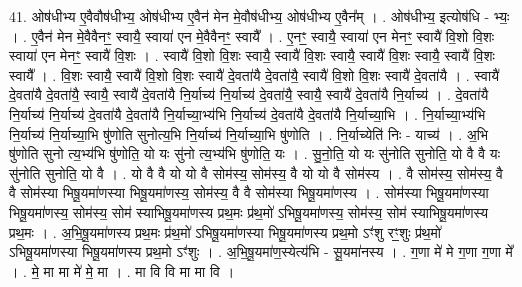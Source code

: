 \documentclass[17pt]{extarticle}
\begin{document}
41. ओष॑धीभ्य ए॒वैवौष॑धीभ्य॒ ओष॑धीभ्य ए॒वैन॑ मेन मे॒वौष॑धीभ्य॒ ओष॑धीभ्य ए॒वैन᳚म् । . ओष॑धीभ्य॒ इत्योष॑धि - भ्यः॒ । . ए॒वैन॑ मेन मे॒वैवैनꣳ॒॒ स्वायै॒ स्वाया॑ एन मे॒वैवैनꣳ॒॒ स्वायै᳚ । . ए॒नꣳ॒॒ स्वायै॒ स्वाया॑ एन मेनꣳ॒॒ स्वायै॑ वि॒शो वि॒शः स्वाया॑ एन मेनꣳ॒॒ स्वायै॑ वि॒शः । . स्वायै॑ वि॒शो वि॒शः स्वायै॒ स्वायै॑ वि॒शः स्वायै॒ स्वायै॑ वि॒शः स्वायै॒ स्वायै॑ वि॒शः स्वायै᳚ । . वि॒शः स्वायै॒ स्वायै॑ वि॒शो वि॒शः स्वायै॑ दे॒वता॑यै दे॒वता॑यै॒ स्वायै॑ वि॒शो वि॒शः स्वायै॑ दे॒वता॑यै । . स्वायै॑ दे॒वता॑यै दे॒वता॑यै॒ स्वायै॒ स्वायै॑ दे॒वता॑यै नि॒र्याच्य॑ नि॒र्याच्य॑ दे॒वता॑यै॒ स्वायै॒ स्वायै॑ दे॒वता॑यै नि॒र्याच्य॑ । . दे॒वता॑यै नि॒र्याच्य॑ नि॒र्याच्य॑ दे॒वता॑यै दे॒वता॑यै नि॒र्याच्या॒भ्य॑भि नि॒र्याच्य॑ दे॒वता॑यै दे॒वता॑यै नि॒र्याच्या॒भि । . नि॒र्याच्या॒भ्य॑भि नि॒र्याच्य॑ नि॒र्याच्या॒भि षु॑णोति सुनोत्य॒भि नि॒र्याच्य॑ नि॒र्याच्या॒भि षु॑णोति । . नि॒र्याच्येति॑ निः - याच्य॑ । . अ॒भि षु॑णोति सुनो त्य॒भ्य॑भि षु॑णोति॒ यो यः सु॑नो त्य॒भ्य॑भि षु॑णोति॒ यः । . सु॒नो॒ति॒ यो यः सु॑नोति सुनोति॒ यो वै वै यः सु॑नोति सुनोति॒ यो वै । . यो वै वै यो यो वै सोम॑स्य॒ सोम॑स्य॒ वै यो यो वै सोम॑स्य । . वै सोम॑स्य॒ सोम॑स्य॒ वै वै सोम॑स्या भिषू॒यमा॑णस्या भिषू॒यमा॑णस्य॒ सोम॑स्य॒ वै वै सोम॑स्या भिषू॒यमा॑णस्य । . सोम॑स्या भिषू॒यमा॑णस्या भिषू॒यमा॑णस्य॒ सोम॑स्य॒ सोम॑ स्याभिषू॒यमा॑णस्य प्रथ॒मः 
प्र॑थ॒मो॑ ऽभिषू॒यमा॑णस्य॒ सोम॑स्य॒ सोम॑ स्याभिषू॒यमा॑णस्य प्रथ॒मः । . अ॒भि॒षू॒यमा॑णस्य प्रथ॒मः प्र॑थ॒मो॑ ऽभिषू॒यमा॑णस्या भिषू॒यमा॑णस्य प्रथ॒मो ऽꣳ॑शु रꣳ॒॒शुः प्र॑थ॒मो॑ ऽभिषू॒यमा॑णस्या भिषू॒यमा॑णस्य प्रथ॒मो ऽꣳ॑शुः । . अ॒भि॒षू॒यमा॑ण॒स्येत्य॑भि - सू॒यमा॑नस्य । . ग॒णा मे॑ मे ग॒णा ग॒णा मे᳚ । . मे॒ मा मा मे॑ मे॒ मा । . मा वि वि मा मा वि । \newline
\end{document}
